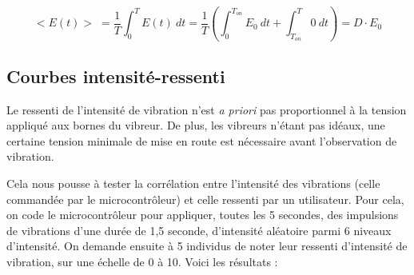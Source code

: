 \documentclass[a4paper, 11pt]{article}
\begin{document}
\begin{equation}
<E(t)> \;
    = \frac{1}{T} \int_0^T{E(t) \: dt}
    = \frac{1}{T} \left(\int_0^{T_{on}}{E_0 \: dt} + \int_{T_{on}}^T{0 \: dt} \right)
    = D \cdot E_0
\end{equation}


\subsection{Courbes intensité-ressenti}

\par Le ressenti de l'intensité de vibration n'est \textit{a priori} pas proportionnel à la tension appliqué aux bornes du vibreur. De plus, les vibreurs n'étant pas idéaux, une certaine tension minimale de mise en route est nécessaire avant l'observation de vibration.

\par Cela nous pousse à tester la corrélation entre l'intensité des vibrations (celle commandée par le microcontrôleur) et celle ressenti par un utilisateur. Pour cela, on code le microcontrôleur pour appliquer, toutes les 5 secondes, des impulsions de vibrations d'une durée de 1,5 seconde, d'intensité aléatoire parmi 6 niveaux d'intensité. On demande ensuite à 5 individus de noter leur ressenti d'intensité de vibration, sur une échelle de 0 à 10. Voici les résultats :
\end{document}
